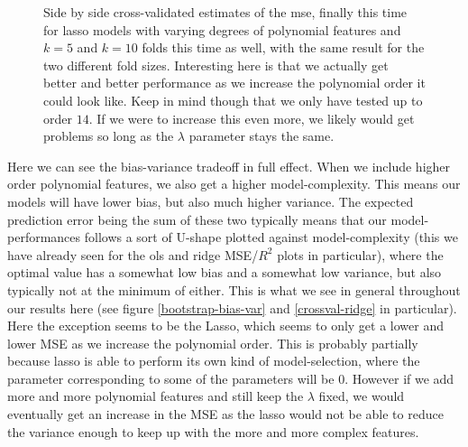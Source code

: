 \documentclass{article}
\begin{document}
\begin{figure}
    \centering
    \quad
    \caption{Side by side cross-validated estimates of the mse, finally this time for lasso models with varying degrees of polynomial features and $k=5$ and
        $k=10$ folds this time as well, with the same result for the two
        different fold sizes. Interesting here is that we actually get better
        and better performance as we increase the polynomial order it could look
        like. Keep in mind though that we only have tested up to order $14$. If
        we were to increase this even more, we likely would get problems so long
        as the $\lambda$ parameter stays the same.}
    \label{crossval-lasso}
\end{figure}

Here we can see the bias-variance tradeoff in full effect. When we include
higher order polynomial features, we also get a higher model-complexity. This
means our models will have lower bias, but also much higher variance. The
expected prediction error being the sum of these two typically means that our
model-performances follows a sort of U-shape plotted against model-complexity
(this we have already seen for the ols and ridge MSE/$R^2$ plots in particular),
where the optimal value has a somewhat low bias and a somewhat low variance, but
also typically not at the minimum of either. This is what we see in general
throughout our results here (see figure \ref{bootstrap-bias-var} and
\ref{crossval-ridge} in particular). Here the exception seems to be the Lasso,
which seems to only get a lower and lower MSE as we increase the polynomial
order.  This is probably partially because lasso is able to perform its own kind
of model-selection, where the parameter corresponding to some of the parameters
will be $0$. However if we add more and more polynomial features and still keep
the $\lambda$ fixed, we would eventually get an increase in the MSE as the lasso
would not be able to reduce the variance enough to keep up with the more and
more complex features.
\end{document}
